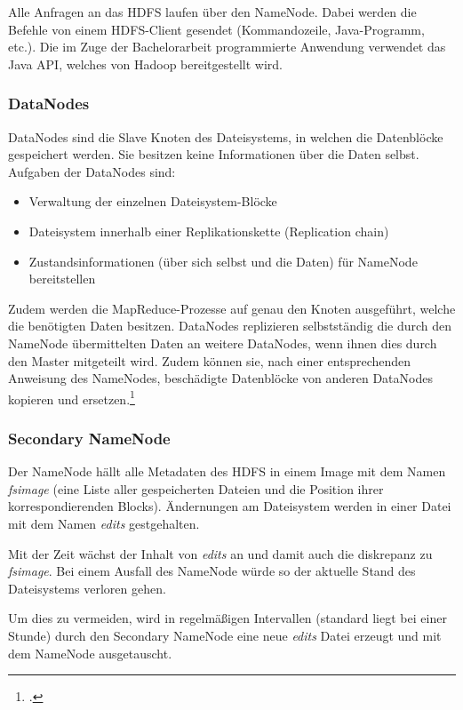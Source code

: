 Alle Anfragen an das \ac{HDFS} laufen über den NameNode. Dabei werden die Befehle von einem \ac{HDFS}-Client gesendet (Kommandozeile, Java-Programm, etc.). Die im Zuge der Bachelorarbeit programmierte Anwendung verwendet das Java \ac{API}, welches von Hadoop bereitgestellt wird.

\subsubsection{DataNodes}
DataNodes sind die Slave Knoten des Dateisystems, in welchen die Datenblöcke gespeichert werden. Sie besitzen keine Informationen über die Daten selbst. Aufgaben der DataNodes sind:

\begin{itemize}
	\item Verwaltung der einzelnen Dateisystem-Blöcke
	\item Dateisystem innerhalb einer Replikationskette (Replication chain)
	\item Zustandsinformationen (über sich selbst und die Daten) für NameNode bereitstellen
\end{itemize}

Zudem werden die MapReduce-Prozesse auf genau den Knoten ausgeführt, welche die benötigten Daten besitzen. DataNodes replizieren selbstständig die durch den NameNode übermittelten Daten an weitere DataNodes, wenn ihnen dies durch den Master mitgeteilt wird. Zudem können sie, nach einer entsprechenden Anweisung des NameNodes, beschädigte Datenblöcke von anderen DataNodes kopieren und ersetzen.\footcite[Vgl.][S. 25 f.]{Wartala.2012}

\subsubsection{Secondary NameNode}
Der NameNode hällt alle Metadaten des \ac{HDFS} in einem Image mit dem Namen \textit{fsimage} (eine Liste aller gespeicherten Dateien und die Position ihrer korrespondierenden Blocks). Ändernungen am Dateisystem werden in einer Datei mit dem Namen \textit{edits} gestgehalten.

Mit der Zeit wächst der Inhalt von \textit{edits} an und damit auch die diskrepanz zu \textit{fsimage}. Bei einem Ausfall des NameNode würde so der aktuelle Stand des Dateisystems verloren gehen.

Um dies zu vermeiden, wird in regelmäßigen Intervallen (standard liegt bei einer Stunde) durch den Secondary NameNode eine neue \textit{edits} Datei erzeugt und mit dem NameNode ausgetauscht.

